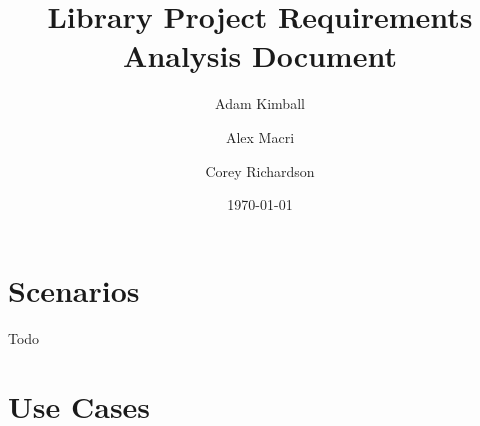 \documentclass[a4paper, 10pt, oneside, draft]{article}
\title{Library Project Requirements Analysis Document}
\date{\today}
\author{Adam Kimball}
\author{Alex Macri}
\author{Corey Richardson}
\begin{document}
\maketitle
\newpage

\section{Scenarios}

Todo

\section{Use Cases}

\end{document}
